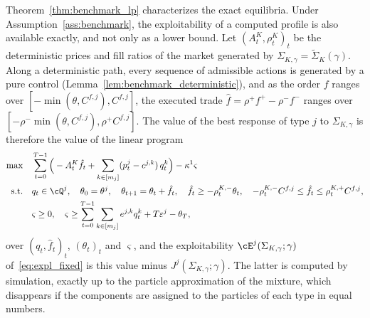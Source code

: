     \begin{remark}
        \label{rem:exact_exploitability}
        Theorem~\ref{thm:benchmark_lp} characterizes the exact equilibria. Under Assumption~\ref{ass:benchmark}, the exploitability of a computed profile is also available exactly, and not only as a lower bound. Let $(A^K_t, \rho^K_t)_t$ be the deterministic prices and fill ratios of the market generated by $\Sigma_{K,\gamma} = \tilde\Sigma_K(\gamma)$. Along a deterministic path, every sequence of admissible actions is generated by a pure control (Lemma~\ref{lem:benchmark_deterministic}), and as the order $f$ ranges over $[-\min(\theta, C^{f,j}), C^{f,j}]$, the executed trade $\hat f = \rho^+ f^+ - \rho^- f^-$ ranges over $[-\rho^- \min(\theta, C^{f,j}), \rho^+ C^{f,j}]$. The value of the best response of type $j$ to $\Sigma_{K,\gamma}$ is therefore the value of the linear program
        $$
        \begin{aligned}
            \max \quad & \sum_{t=0}^{T-1} \Big( - A^K_t \hat f_t + \sum_{k \in [m_j]} (p^j_t - c^{j,k})\, q^k_t \Big) - \kappa^1 \varsigma \\
            \text{s.t.} \quad & q_t \in \cQ^j, \quad \theta_0 = \theta^j, \quad \theta_{t+1} = \theta_t + \hat f_t, \quad \hat f_t \ge -\rho^{K,-}_t \theta_t, \quad -\rho^{K,-}_t C^{f,j} \le \hat f_t \le \rho^{K,+}_t C^{f,j}, \\
            & \varsigma \ge 0, \quad \varsigma \ge \sum_{t=0}^{T-1} \sum_{k \in [m_j]} e^{j,k} q^k_t + T\varepsilon^j - \theta_T,
        \end{aligned}
        $$
        over $(q_t, \hat f_t)_t$, $(\theta_t)_t$ and $\varsigma$, and the exploitability $\cE^j(\Sigma_{K,\gamma}; \gamma)$ of~\eqref{eq:expl_fixed} is this value minus $J^j(\Sigma_{K,\gamma}; \gamma)$. The latter is computed by simulation, exactly up to the particle approximation of the mixture, which disappears if the components are assigned to the particles of each type in equal numbers.
    \end{remark}

